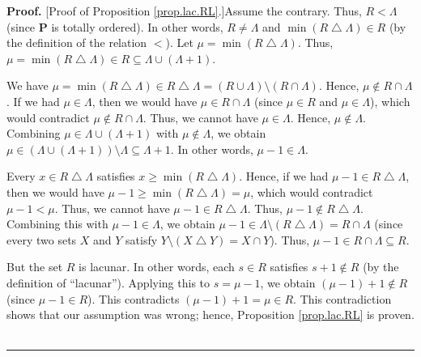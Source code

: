 \documentclass[numbers=enddot,12pt,final,onecolumn,notitlepage]{scrartcl}%
\theoremstyle{definition}
\newenvironment{proof}[1][Proof]{\noindent\textbf{#1.} }{\ \rule{0.5em}{0.5em}}
\begin{document}
\begin{proof}
[Proof of Proposition \ref{prop.lac.RL}.]Assume the contrary. Thus,
$R<\Lambda$ (since $\mathbf{P}$ is totally ordered). In other words,
$R\neq\Lambda$ and $\min\left(  R\bigtriangleup\Lambda\right)  \in R$ (by the
definition of the relation $<$). Let $\mu=\min\left(  R\bigtriangleup
\Lambda\right)  $. Thus, $\mu=\min\left(  R\bigtriangleup\Lambda\right)  \in
R\subseteq\Lambda\cup\left(  \Lambda+1\right)  $.

We have $\mu=\min\left(  R\bigtriangleup\Lambda\right)  \in R\bigtriangleup
\Lambda=\left(  R\cup\Lambda\right)  \setminus\left(  R\cap\Lambda\right)  $.
Hence, $\mu\notin R\cap\Lambda$. If we had $\mu\in\Lambda$, then we would have
$\mu\in R\cap\Lambda$ (since $\mu\in R$ and $\mu\in\Lambda$), which would
contradict $\mu\notin R\cap\Lambda$. Thus, we cannot have $\mu\in\Lambda$.
Hence, $\mu\notin\Lambda$. Combining $\mu\in\Lambda\cup\left(  \Lambda
+1\right)  $ with $\mu\notin\Lambda$, we obtain $\mu\in\left(  \Lambda
\cup\left(  \Lambda+1\right)  \right)  \setminus\Lambda\subseteq\Lambda+1$. In
other words, $\mu-1\in\Lambda$.

Every $x\in R\bigtriangleup\Lambda$ satisfies $x\geq\min\left(
R\bigtriangleup\Lambda\right)  $. Hence, if we had $\mu-1\in R\bigtriangleup
\Lambda$, then we would have $\mu-1\geq\min\left(  R\bigtriangleup
\Lambda\right)  =\mu$, which would contradict $\mu-1<\mu$. Thus, we cannot
have $\mu-1\in R\bigtriangleup\Lambda$. Thus, $\mu-1\notin R\bigtriangleup
\Lambda$. Combining this with $\mu-1\in\Lambda$, we obtain $\mu-1\in
\Lambda\setminus\left(  R\bigtriangleup\Lambda\right)  =R\cap\Lambda$ (since
every two sets $X$ and $Y$ satisfy $Y\setminus\left(  X\bigtriangleup
Y\right)  =X\cap Y$). Thus, $\mu-1\in R\cap\Lambda\subseteq R$.

But the set $R$ is lacunar. In other words, each $s\in R$ satisfies $s+1\notin
R$ (by the definition of \textquotedblleft lacunar\textquotedblright).
Applying this to $s=\mu-1$, we obtain $\left(  \mu-1\right)  +1\notin R$
(since $\mu-1\in R$). This contradicts $\left(  \mu-1\right)  +1=\mu\in R$.
This contradiction shows that our assumption was wrong; hence, Proposition
\ref{prop.lac.RL} is proven.
\end{proof}
\end{document}
